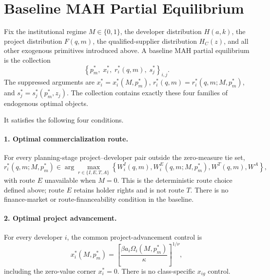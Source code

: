 \section{Baseline MAH Partial Equilibrium}
\label{sec:p07-equilibrium}

Fix the institutional regime \(M\in\{0,1\}\), the developer distribution
\(H(a,k)\), the project distribution \(F(q,m)\), the qualified-supplier
distribution \(H_C(z)\), and all other exogenous primitives introduced above.
A baseline MAH partial equilibrium is the collection
\begin{equation}
  \boxed{
  \left\{
    p_m^*,\;
    x_i^*,\;
    r_i^*(q,m),\;
    s_j^*
  \right\}_{i,j}}
  .
  \label{eq:p07-equilibrium-collection}
\end{equation}
The suppressed arguments are \(x_i^*=x_i^*(M,p_m^*)\),
\(r_i^*(q,m)=r_i^*(q,m;M,p_m^*)\), and
\(s_j^*=s_j^*(p_m^*,z_j)\). The collection contains exactly these four
families of endogenous optimal objects.

It satisfies the following four conditions.

\paragraph{1. Optimal commercialization route.}
For every planning-stage project--developer pair outside the zero-measure tie
set,
\begin{equation}
  r_i^*(q,m;M,p_m^*)
  \in
  \arg\max_{r\in\{I,E,T,A\}}
  \left\{
    W_i^I(q,m),
    W_i^E(q,m;M,p_m^*),
    W^T(q,m),
    W^A
  \right\},
  \label{eq:p07-route-optimality}
\end{equation}
with route \(E\) unavailable when \(M=0\). This is the deterministic route
choice defined above; route \(E\) retains holder rights and is not route \(T\).
There is no finance-market or route-financeability condition in the baseline.

\paragraph{2. Optimal project advancement.}
For every developer \(i\), the common project-advancement control is
\begin{equation}
  x_i^*(M,p_m^*)
  =
  \left[
    \frac{\beta a_i\Omega_i(M,p_m^*)}{\kappa}
  \right]^{1/\nu},
  \label{eq:p07-advancement-optimality}
\end{equation}
including the zero-value corner \(x_i^*=0\). There is no class-specific
\(x_{ig}\) control.

